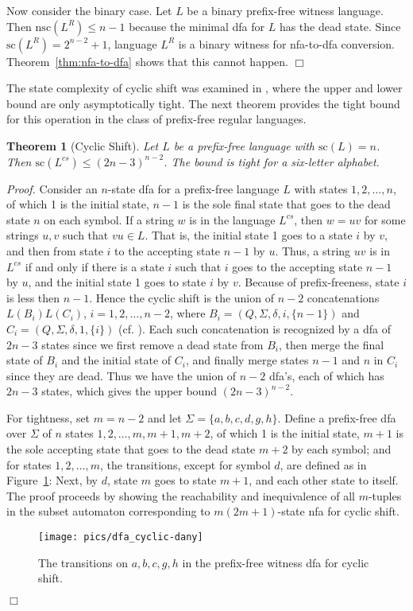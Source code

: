 \documentclass[copyright]{eptcs}
\newtheorem{theorem}{Theorem}
\newcommand{\nsc}{\mathrm{nsc}}
\renewcommand{\sc}{\mathrm{sc}}
\renewcommand{\le}{\leqslant}
\begin{document}
  Now consider the binary case. 
  Let $L$ be a binary prefix-free witness language.
  Then $\nsc(L^R)\le n-1$ because  the minimal dfa for $L$ has the dead state.
  Since $\sc(L^R)=2^{n-2}+1$,  language $L^R$
  is a binary witness for  nfa-to-dfa conversion.
  Theorem~\ref{thm:nfa-to-dfa} shows that this cannot happen.
 \hfill$\Box$\medskip

 The state complexity of cyclic shift was examined in \cite{jo08}, 
 where the upper and lower
 bound are only asymptotically tight. The next theorem provides the tight bound
 for this operation in the class of prefix-free regular languages.

 \begin{theorem}[Cyclic Shift]\label{thm:sc_cyclic}
  Let $L$ be a prefix-free  language with $\sc(L)=n$.
  Then $\sc(L^{cs})\le (2n-3)^{n-2}$. The bound is tight
  for a six-letter alphabet. 
 \end{theorem}

 \noindent\emph{Proof.}
  Consider an $n$-state dfa  for a prefix-free language $L$
  with states $1,2,\ldots, n$,
  of which 1 is the initial state,
  $n-1$ is the sole final state that goes to the dead state $n$ on each symbol.
  If a string $w$ is in the language $L^{cs}$,
  then $w=uv$ for some strings $u,v$ such that $vu\in L$.
  That is, the initial state 1 goes to a state $i$ by $v$,
  and then from state $i$ to the accepting state $n-1$ by $u$.
  Thus, a string $uv$ is in $L^{cs}$ if and only if
  there is a state $i$ such that $i$ goes to the accepting state $n-1$ by $u$,
  and the initial state 1 goes to state $i$ by $v$.
  Because of prefix-freeness,
  state $i$ is less then  $n-1$.
  Hence the cyclic shift is the union of $n-2$ concatenations
  $L(B_i)L(C_i)$, $i=1,2,\ldots,n-2$, where
  $B_i=(Q,\Sigma,\delta,i,\{n-1\} )$ and
  $C_i=(Q,\Sigma,\delta,1,\{i\} )$ (cf. \cite{jo08}).
  Each such concatenation is recognized by a dfa of $2n-3$ states
  since we first remove a dead state from $B_i$,
  then merge the final state of $B_i$ and the initial state of $C_i$,
  and finally merge states $n-1$ and $n$ in $C_i$
  since they are dead.
  Thus we have the union of $n-2$ dfa's,
  each of which has $2n-3$ states,
  which gives the upper bound $(2n-3)^{n-2}$.

  For tightness, set $m=n-2$ and let
  $\Sigma=\{a,b,c,d,g,h\}$.
  Define a prefix-free dfa  over $\Sigma$ of $n$ states $1,2,\ldots,m,m+1,m+2$,
  of which 1 is the initial state,
  $m+1$ is the sole accepting state that goes to the dead state $m+2$ 
  by each symbol;
  and for states $1,2,\ldots,m$, the transitions, except for symbol $d$, are defined
  as in Figure~\ref{fig:dfa_cyclic-dany}:
  Next,     by $d$, state $m$ goes to state $m+1$,
  and each other state to itself.
  The proof proceeds by showing the reachability 
  and inequivalence of all $m$-tuples in the subset automaton 
  corresponding to  $m(2m+1)$-state nfa for cyclic shift.
  \begin{figure}[t]
  \centerline{\texttt{[image: pics/dfa\_cyclic-dany]}}
  \caption{The transitions on $a,b,c,g,h$ in the prefix-free 
           witness dfa for cyclic shift.}
  \label{fig:dfa_cyclic-dany}
  \end{figure}
 \hfill$\Box$
\end{document}
